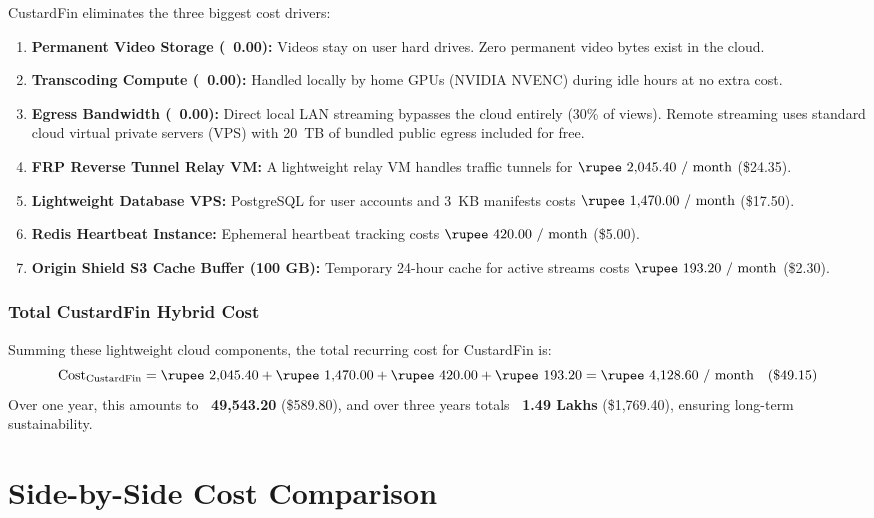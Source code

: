 CustardFin eliminates the three biggest cost drivers:
\begin{enumerate}
    \item \textbf{Permanent Video Storage (\rupee~0.00):} Videos stay on user hard drives. Zero permanent video bytes exist in the cloud.
    \item \textbf{Transcoding Compute (\rupee~0.00):} Handled locally by home GPUs (NVIDIA NVENC) during idle hours at no extra cost.
    \item \textbf{Egress Bandwidth (\rupee~0.00):} Direct local LAN streaming bypasses the cloud entirely (30\% of views). Remote streaming uses standard cloud virtual private servers (VPS) with 20~TB of bundled public egress included for free.
    \item \textbf{FRP Reverse Tunnel Relay VM:} A lightweight relay VM handles traffic tunnels for $\mathbf{\text{\rupee~2{,}045.40 / month}}$ (\$24.35).
    \item \textbf{Lightweight Database VPS:} PostgreSQL for user accounts and 3~KB manifests costs $\mathbf{\text{\rupee~1{,}470.00 / month}}$ (\$17.50).
    \item \textbf{Redis Heartbeat Instance:} Ephemeral heartbeat tracking costs $\mathbf{\text{\rupee~420.00 / month}}$ (\$5.00).
    \item \textbf{Origin Shield S3 Cache Buffer (100 GB):} Temporary 24-hour cache for active streams costs $\mathbf{\text{\rupee~193.20 / month}}$ (\$2.30).
\end{enumerate}

\subsubsection{Total CustardFin Hybrid Cost}
Summing these lightweight cloud components, the total recurring cost for CustardFin is:
\begin{equation}
    \text{Cost}_{\text{CustardFin}} = \text{\rupee~2,045.40} + \text{\rupee~1,470.00} + \text{\rupee~420.00} + \text{\rupee~193.20} = \mathbf{\text{\rupee~4{,}128.60 / month}} \quad (\$49.15)
\end{equation}
Over one year, this amounts to \textbf{\rupee~49{,}543.20} (\$589.80), and over three years totals \textbf{\rupee~1.49 Lakhs} (\$1,769.40), ensuring long-term sustainability.

\section{Side-by-Side Cost Comparison}
\label{sec:cost_comparison}

